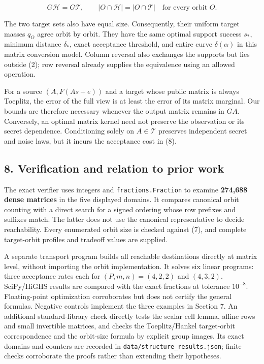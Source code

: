 \documentclass[
]{article}
\begin{document}
\[
G\mathcal H=G\mathcal T,\qquad
|O\cap\mathcal H|=|O\cap\mathcal T|\quad\text{for every orbit }O.
\]

The two target sets also have equal size. Consequently, their uniform
target masses \(q_O\) agree orbit by orbit. They have the same optimal
support success \(s_*\), minimum distance \(\delta_*\), exact acceptance
threshold, and entire curve \(\delta(\alpha)\) in this matrix conversion
model. Column reversal also exchanges the supports but lies outside (2);
row reversal already supplies the equivalence using an allowed
operation.

For a source \((A,F(As+e))\) and a target whose public matrix is always
Toeplitz, the error of the full view is at least the error of its matrix
marginal. Our bounds are therefore necessary whenever the output matrix
remains in \(GA\). Conversely, an optimal matrix kernel need not
preserve the observation or its secret dependence. Conditioning solely
on \(A\in\mathcal T\) preserves independent secret and noise laws, but
it incurs the acceptance cost in (8).

\subsection{8. Verification and relation to prior
work}\label{verification-and-relation-to-prior-work}

The exact verifier uses integers and \texttt{fractions.Fraction} to
examine \textbf{274,688 dense matrices} in the five displayed domains.
It compares canonical orbit counting with a direct search for a signed
ordering whose row prefixes and suffixes match. The latter does not use
the canonical representative to decide reachability. Every enumerated
orbit size is checked against (7), and complete target-orbit profiles
and tradeoff values are supplied.

A separate transport program builds all reachable destinations directly
at matrix level, without importing the orbit implementation. It solves
six linear programs: three acceptance rates each for \((P,m,n)=(4,2,2)\)
and \((4,3,2)\). SciPy/HiGHS results are compared with the exact
fractions at tolerance \(10^{-8}\). Floating-point optimization
corroborates but does not certify the general formulas. Negative
controls implement the three examples in Section 7. An additional
standard-library check directly tests the scalar cell lemma, affine rows
and small invertible matrices, and checks the Toeplitz/Hankel
target-orbit correspondence and the orbit-size formula by explicit group
images. Its exact domains and counters are recorded in
\texttt{data/structure\_results.json}; finite checks corroborate the
proofs rather than extending their hypotheses.
\end{document}
